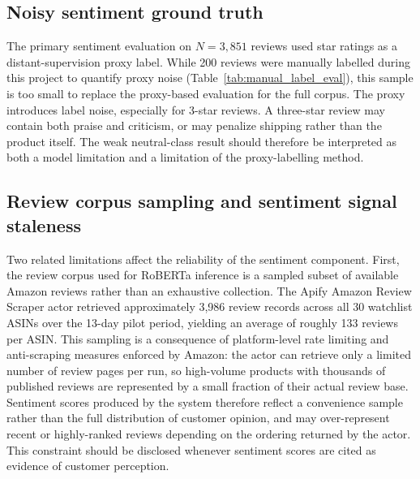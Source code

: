 \subsection{Noisy sentiment ground truth}

The primary sentiment evaluation on $N = 3{,}851$ reviews used star ratings as a distant-supervision proxy label. While 200 reviews were manually labelled during this project to quantify proxy noise (Table~\ref{tab:manual_label_eval}), this sample is too small to replace the proxy-based evaluation for the full corpus. The proxy introduces label noise, especially for 3-star reviews. A three-star review may contain both praise and criticism, or may penalize shipping rather than the product itself. The weak neutral-class result should therefore be interpreted as both a model limitation and a limitation of the proxy-labelling method.

\subsection{Review corpus sampling and sentiment signal staleness}

Two related limitations affect the reliability of the sentiment component. First, the review corpus used for RoBERTa inference is a sampled subset of available Amazon reviews rather than an exhaustive collection. The Apify Amazon Review Scraper actor retrieved approximately 3,986 review records across all 30 watchlist ASINs over the 13-day pilot period, yielding an average of roughly 133 reviews per ASIN. This sampling is a consequence of platform-level rate limiting and anti-scraping measures enforced by Amazon: the actor can retrieve only a limited number of review pages per run, so high-volume products with thousands of published reviews are represented by a small fraction of their actual review base. Sentiment scores produced by the system therefore reflect a convenience sample rather than the full distribution of customer opinion, and may over-represent recent or highly-ranked reviews depending on the ordering returned by the actor. This constraint should be disclosed whenever sentiment scores are cited as evidence of customer perception.


